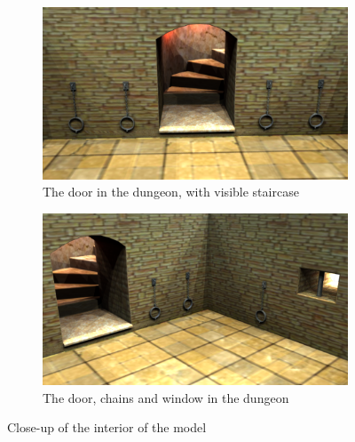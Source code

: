 \begin{figure}[h!]
    \centering
    \begin{subfigure}[h!]{0.8\textwidth}
    	\centering
        \includegraphics[width=\textwidth]{figures/interior0.png}
        \caption{The door in the dungeon, with visible staircase}\label{fig:interior0}
    \end{subfigure}
    \begin{subfigure}[h!]{0.8\textwidth}
    	\centering
        \includegraphics[width=\textwidth]{figures/interior1.png}
        \caption{The door, chains and window in the dungeon}\label{fig:interior1}
    \end{subfigure}
    \caption{Close-up of the interior of the model}\label{interior}
\end{figure}
